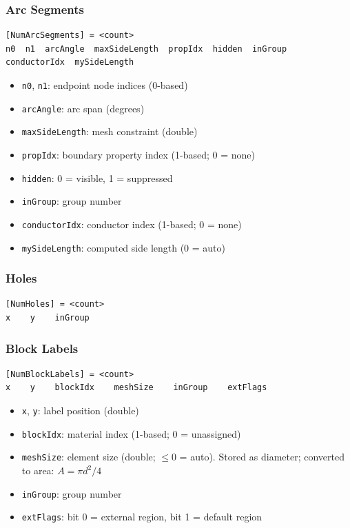 \documentclass[11pt]{article}
\begin{document}
\subsubsection{Arc Segments}

\begin{lstlisting}
[NumArcSegments] = <count>
n0  n1  arcAngle  maxSideLength  propIdx  hidden  inGroup  conductorIdx  mySideLength
\end{lstlisting}

\begin{itemize}[nosep]
  \item \texttt{n0}, \texttt{n1}: endpoint node indices (0-based)
  \item \texttt{arcAngle}: arc span (degrees)
  \item \texttt{maxSideLength}: mesh constraint (double)
  \item \texttt{propIdx}: boundary property index (1-based; 0 = none)
  \item \texttt{hidden}: 0 = visible, 1 = suppressed
  \item \texttt{inGroup}: group number
  \item \texttt{conductorIdx}: conductor index (1-based; 0 = none)
  \item \texttt{mySideLength}: computed side length (0 = auto)
\end{itemize}

\subsubsection{Holes}

\begin{lstlisting}
[NumHoles] = <count>
x    y    inGroup
\end{lstlisting}

\subsubsection{Block Labels}

\begin{lstlisting}
[NumBlockLabels] = <count>
x    y    blockIdx    meshSize    inGroup    extFlags
\end{lstlisting}

\begin{itemize}[nosep]
  \item \texttt{x}, \texttt{y}: label position (double)
  \item \texttt{blockIdx}: material index (1-based; 0 = unassigned)
  \item \texttt{meshSize}: element size (double; $\leq 0$ = auto).
        Stored as diameter; converted to area: $A = \pi d^2/4$
  \item \texttt{inGroup}: group number
  \item \texttt{extFlags}: bit 0 = external region, bit 1 = default region
\end{itemize}
\end{document}
